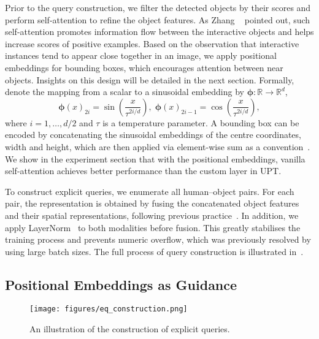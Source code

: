 \documentclass[10pt,twocolumn,letterpaper]{article}
\begin{document}
Prior to the query construction, we filter the detected objects by their scores and perform self-attention to refine the object features. As Zhang \etal~\cite{upt} pointed out, such self-attention promotes information flow between the interactive objects and helps increase scores of positive examples. Based on the observation that interactive instances tend to appear close together in an image, we apply positional embeddings for bounding boxes, which encourages attention between near objects. Insights on this design will be detailed in the next section. 
Formally, denote the mapping from a scalar to a sinusoidal embedding by $\boldsymbol{\phi}: \mathbb{R} \to \mathbb{R}^d$,
\begin{equation}
   \boldsymbol{\phi}(x)_{2i} = \sin\left(\frac{x}{\tau^{2i/d}}\right),\; \boldsymbol{\phi}(x)_{2i - 1} = \cos\left(\frac{x}{\tau^{2i/d}}\right),
\end{equation}
where $i=1,\ldots,d/2$ and $\tau$ is a temperature parameter. A bounding box can be encoded by concatenating the sinusoidal embeddings of the centre coordinates, width and height, which are then applied via element-wise sum as a convention~\cite{xfmer, detr}. We show in the experiment section that with the positional embeddings, vanilla self-attention achieves better performance than the custom layer in UPT.

To construct explicit queries, we enumerate all human--object pairs. For each pair, the representation is obtained by fusing the concatenated object features and their spatial representations, following previous practice~\cite{scg, upt}. In addition, we apply LayerNorm~\cite{ln} to both modalities before fusion. This greatly stabilises the training process and prevents numeric overflow, which was previously resolved by using large batch sizes. The full process of query construction is illustrated in~.

\subsection{Positional Embeddings as Guidance}

\begin{figure}[t]
   \centering
   \texttt{[image: figures/eq\_construction.png]}
   \caption{An illustration of the construction of explicit queries.}
   \label{fig:eq-construction}
\end{figure}
\end{document}
